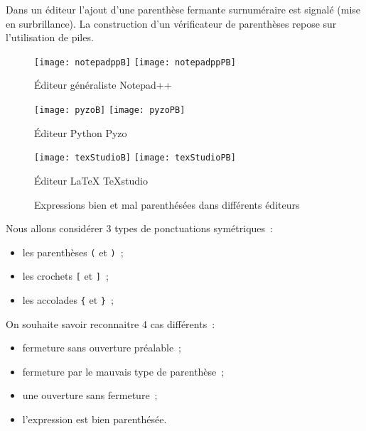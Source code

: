 

Dans un éditeur l'ajout d'une parenthèse fermante surnuméraire est signalé (mise en surbrillance). La construction d'un vérificateur de parenthèses repose sur l'utilisation de piles.

\begin{figure}[hbt]
	\begin{center}
		\begin{minipage}[t]{0.32\textwidth}
			\centering
			\texttt{[image: notepadppB]}
			\texttt{[image: notepadppPB]}
			\caption{Éditeur généraliste Notepad++}
		\end{minipage}
		\hfill
		\begin{minipage}[t]{0.32\textwidth}
			\centering
			\texttt{[image: pyzoB]}
			\texttt{[image: pyzoPB]}
			\caption{Éditeur Python Pyzo}
		\end{minipage}
		\hfill
		\begin{minipage}[t]{0.32\textwidth}
			\centering
			\texttt{[image: texStudioB]}
			\texttt{[image: texStudioPB]}
			\caption{Éditeur LaTeX TeXstudio}
		\end{minipage}
		\caption{Expressions bien et mal parenthésées dans différents éditeurs}
	\end{center}
\end{figure}

Nous allons considérer 3 types de ponctuations symétriques~: 
\begin{itemize}
	\item les parenthèses \texttt{(} et \texttt{)}~; 
	\item les crochets \texttt{[} et \texttt{]}~; 
	\item les accolades \texttt{\{} et \texttt{\}}~; 
\end{itemize}

On souhaite savoir reconnaitre 4 cas différents~: 
\begin{itemize}
	\item fermeture sans ouverture préalable~; 
	\item fermeture par le mauvais type de parenthèse~; 
	\item une ouverture sans fermeture~; 
	\item l'expression est bien parenthésée. 
\end{itemize}


